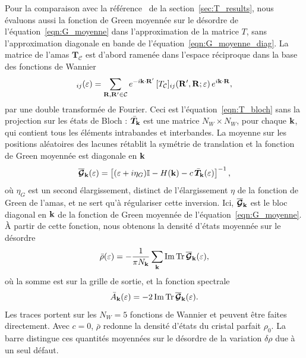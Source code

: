 Pour la comparaison avec la référence~\cite{kaasbjergAtomisticMatrixTheory2020} de la section~\ref{sec:T_results}, nous évaluons aussi la fonction de Green moyennée sur le désordre de l'équation~\eqref{eqn:G_moyenne} dans l'approximation de la matrice $T$, sans l'approximation diagonale en bande de l'équation~\eqref{eqn:G_moyenne_diag}. La matrice de l'amas $\bm T_\mathcal{C}$ est d'abord ramenée dans l'espace réciproque dans la base des fonctions de Wannier
\begin{equation}
    [\bar T_\kv]_{ij}(\varepsilon) = \sum_{\Rv,\Rv'\in\mathcal{C}} e^{-i\kv\cdot\Rv'}\,[T_\mathcal{C}]_{ij}(\Rv',\Rv;\varepsilon)\,e^{i\kv\cdot\Rv},\label{eqn:T_bar_k}
\end{equation}
par une double transformée de Fourier. Ceci est l'équation~\eqref{eqn:T_bloch} sans la projection sur les états de Bloch : $\bar{\bm T}_{\mathbf{k}}$ est une matrice $N_W\times N_W$, pour chaque $\mathbf{k}$, qui contient tous les éléments intrabandes et interbandes. La moyenne sur les positions aléatoires des lacunes rétablit la symétrie de translation et la fonction de Green moyennée est diagonale en $\mathbf{k}$
\begin{equation}
    \overline{\bm{\mathcal{G}}}_{\mathbf{k}}(\varepsilon) = \left[(\varepsilon+i\eta_G)\mathbb{I}-H(\mathbf{k})-c\,\bar{\bm T}_{\mathbf{k}}(\varepsilon)\right]^{-1},\label{eqn:G_moyenne_W}
\end{equation}
où $\eta_G$ est un second élargissement, distinct de l'élargissement $\eta$ de la fonction de Green de l'amas, et ne sert qu'à régulariser cette inversion. Ici, $\overline{\bm{\mathcal{G}}}_{\mathbf{k}}$ est le bloc diagonal en $\mathbf{k}$ de la fonction de Green moyennée de l'équation~\eqref{eqn:G_moyenne}. À partir de cette fonction, nous obtenons la densité d'états moyennée sur le désordre
\begin{equation}
    \bar\rho(\varepsilon) = -\frac{1}{\pi N_{\mathbf{k}}}\sum_{\mathbf{k}} \mathrm{Im}\,\mathrm{Tr}\,\overline{\bm{\mathcal{G}}}_{\mathbf{k}}(\varepsilon),
   \label{eqn:rho_dis}
\end{equation}
où la somme est sur la grille de sortie, et la fonction spectrale
\begin{equation}
     \bar A_{\mathbf{k}}(\varepsilon) = -2\,\mathrm{Im}\,\mathrm{Tr}\,\overline{\bm{\mathcal{G}}}_{\mathbf{k}}(\varepsilon).\label{eqn:A_k}
\end{equation}
Les traces portent sur les $N_W=5$ fonctions de Wannier et peuvent être faites directement. Avec $c=0$, $\bar\rho$ redonne la densité d'états du cristal parfait $\rho_0$. La barre distingue ces quantités moyennées sur le désordre de la variation $\delta\rho$ due à un seul défaut.

